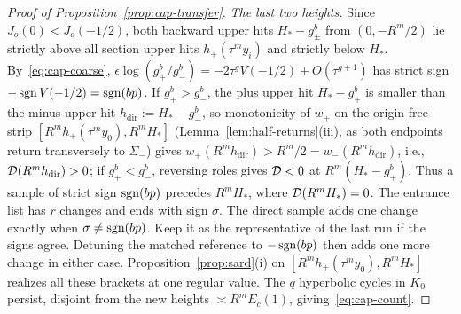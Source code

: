 \begin{proof}[Proof of Proposition~\ref{prop:cap-transfer}]
\emph{The last two heights.} Since $J_o(0)<J_o(-1/2)$, both backward upper hits $H_*-g_\pm^b$ from $(0,-R^m/2)$ lie strictly above all section upper hits $h_+(\tau^m y_i)$ and strictly below $H_*$. By~\eqref{eq:cap-coarse}, $\epsilon\log(g_+^b/g_-^b)=-2\tau^g V(-1/2)+O(\tau^{g+1})$ has strict sign $-\operatorname{sgn} V(-1/2)=\operatorname{sgn}(bp)$. If $g_+^b>g_-^b$, the plus upper hit $H_*-g_+^b$ is smaller than the minus upper hit $h_{\mathrm{dir}}:=H_*-g_-^b$, so monotonicity of $w_+$ on the origin-free strip $[R^m h_+(\tau^m y_0),R^m H_*]$ (Lemma~\ref{lem:half-returns}(iii), as both endpoints return transversely to $\Sigma_-$) gives $w_+(R^m h_{\mathrm{dir}})>R^m/2=w_-(R^m h_{\mathrm{dir}})$, i.e., $\mathcal{D}(R^m h_{\mathrm{dir}})>0$; if $g_+^b<g_-^b$, reversing roles gives $\mathcal{D}<0$ at $R^m(H_*-g_+^b)$. Thus a sample of strict sign $\operatorname{sgn}(bp)$ precedes $R^m H_*$, where $\mathcal{D}(R^m H_*)=0$. The entrance list has $r$ changes and ends with sign $\sigma$.
The direct sample adds one change exactly when $\sigma\ne\operatorname{sgn}(bp)$.
Keep it as the representative of the last run if the signs agree.
Detuning the matched reference to $-\operatorname{sgn}(bp)$ then adds one more
change in either case. Proposition~\ref{prop:sard}(i) on
$[R^m h_+(\tau^m y_0),R^m H_*]$ realizes all these brackets at one
regular value. The $q$ hyperbolic cycles in $K_0$ persist, disjoint
from the new heights $\asymp R^m E_c(1)$, giving~\eqref{eq:cap-count}.
\end{proof}


